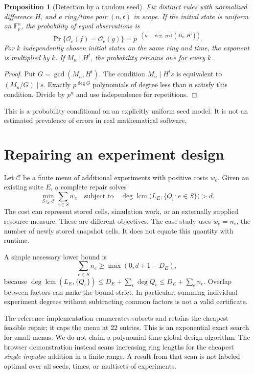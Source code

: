 \documentclass{ijuc}
\newtheorem{proposition}[theorem]{Proposition}
\newcommand{\Fp}{\mathbb F_p}
\newcommand{\Obs}{\mathcal O}
\newcommand{\lcmop}{\operatorname{lcm}}
\begin{document}
\begin{proposition}[Detection by a random seed]\label{prop:random}
Fix distinct rules with normalized difference $H$, and a ring/time pair $(n,t)$ in scope. If the initial state is uniform on $\Fp^n$, the probability of equal observations is
\begin{equation}
 \Pr\{\Obs_e(f)=\Obs_e(g)\}
 =p^{-\left(n-\deg\gcd(M_n,H^t)\right)}.
 \label{eq:random}
\end{equation}
For $k$ independently chosen initial states on the same ring and time, the exponent is multiplied by $k$. If $M_n\mid H^t$, the probability remains one for every $k$.
\end{proposition}
\begin{proof}
Put $G=\gcd(M_n,H^t)$. The condition $M_n\mid H^t s$ is equivalent to $(M_n/G)\mid s$. Exactly $p^{\deg G}$ polynomials of degree less than $n$ satisfy this condition. Divide by $p^n$ and use independence for repetitions.
\end{proof}
This is a probability conditional on an explicitly uniform seed model. It is not an estimated prevalence of errors in real mathematical software.

\section{Repairing an experiment design}
Let $\mathcal C$ be a finite menu of additional experiments with positive costs $w_e$. Given an existing suite $E$, a complete repair solves
\begin{equation}
 \min_{S\subseteq\mathcal C}\sum_{e\in S}w_e
 \quad\text{subject to}\quad
 \deg\lcmop\bigl(L_E,\{Q_e:e\in S\}\bigr)>d.
 \label{eq:repair}
\end{equation}
The cost can represent stored cells, simulation work, or an externally supplied resource measure. These are different objectives. The case study uses $w_e=n_e$, the number of newly stored snapshot cells. It does not equate this quantity with runtime.

A simple necessary lower bound is
\begin{equation}
 \sum_{e\in S}n_e\geq\max(0,d+1-D_E),
 \label{eq:lower}
\end{equation}
because $\deg\lcmop(L_E,\{Q_e\})\leq D_E+\sum_e\deg Q_e\leq D_E+\sum_e n_e$. Overlap between factors can make the bound strict. In particular, summing individual experiment degrees without subtracting common factors is not a valid certificate.

The reference implementation enumerates subsets and retains the cheapest feasible repair; it caps the menu at 22 entries. This is an exponential exact search for small menus. We do not claim a polynomial-time global design algorithm. The browser demonstration instead scans increasing ring lengths for the cheapest \emph{single impulse} addition in a finite range. A result from that scan is not labeled optimal over all seeds, times, or multisets of experiments.
\end{document}
